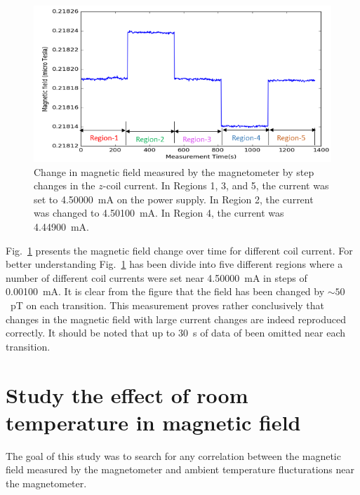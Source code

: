 \begin{figure}%
\centering
\includegraphics[width=0.7\linewidth]{figures/field_change_with_current}  
\caption{Change in magnetic field measured by the magnetometer by step
  changes in the $z$-coil current.  In Regions 1, 3, and 5, the
  current was set to 4.50000~mA on the power supply.  In Region 2, the
  current was changed to 4.50100~mA.  In Region 4, the current was
  4.44900~mA.\label{fig:field-change}}
\end{figure} 
 
Fig.~\ref{fig:field-change} presents the magnetic field change over
time for different coil current. For better understanding
Fig.~\ref{fig:field-change} has been divide into five different
regions where a number of different coil currents were set near
4.50000~mA in steps of 0.00100~mA.  It is clear from the figure that
the field has been changed by $\sim 50$~pT on each transition.  This
measurement proves rather conclusively that changes in the magnetic
field with large current changes are indeed reproduced correctly.  It
should be noted that up to 30~s of data of been omitted near each
transition.


\section{Study the effect of room temperature in magnetic field} 

The goal of this study was to search for any correlation between the
magnetic field measured by the magnetometer and ambient temperature
flucturations near the magnetometer.

